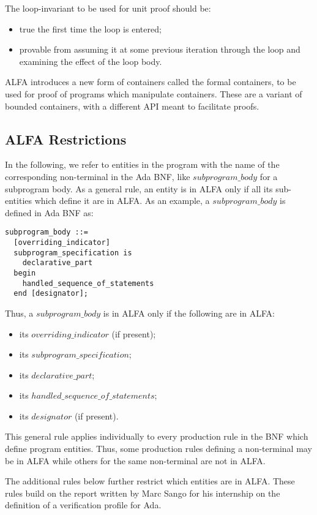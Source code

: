 \documentclass{article}
\newcommand{\bnf}[1]{$\mathit{#1}$}
\begin{document}
The loop-invariant to be used for unit proof should be:
\begin{itemize}
\item true the first time the loop is entered;
\item provable from assuming it at some previous iteration through the loop and
  examining the effect of the loop body.
\end{itemize}

ALFA introduces a new form of containers called the formal containers, to be
used for proof of programs which manipulate containers. These are a variant of
bounded containers, with a different API meant to facilitate proofs.

\subsection{ALFA Restrictions}

In the following, we refer to entities in the program with the name of the
corresponding non-terminal in the Ada BNF, like \bnf{subprogram\_body} for a
subprogram body. As a general rule, an entity is in ALFA only if all its
sub-entities which define it are in ALFA. As an example, a
\bnf{subprogram\_body} is defined in Ada BNF as:

\begin{verbatim}
subprogram_body ::=
  [overriding_indicator]
  subprogram_specification is
    declarative_part
  begin
    handled_sequence_of_statements
  end [designator];
\end{verbatim}

Thus, a \bnf{subprogram\_body} is in ALFA only if the following are in ALFA:
\begin{itemize}
\item its \bnf{overriding\_indicator} (if present);
\item its \bnf{subprogram\_specification};
\item its \bnf{declarative\_part};
\item its \bnf{handled\_sequence\_of\_statements};
\item its \bnf{designator} (if present).
\end{itemize}

This general rule applies individually to every production rule in the BNF
which define program entities. Thus, some production rules defining a
non-terminal may be in ALFA while others for the same non-terminal are not in
ALFA.

The additional rules below further restrict which entities are in ALFA. These
rules build on the report written by Marc Sango for his internship on the
definition of a verification profile for Ada. 
\end{document}
